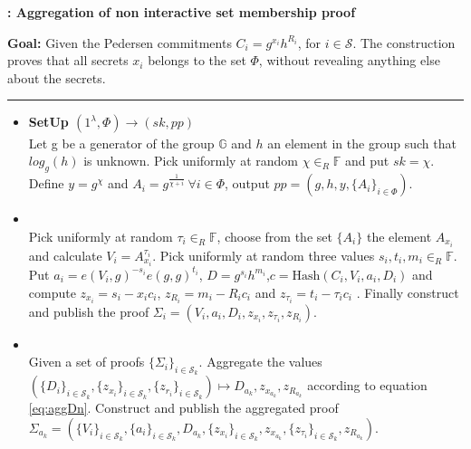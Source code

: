 \begin{algorithm}[]
\caption{\textbf{: Aggregation of non interactive set membership proof}}
\textbf{Goal:}  Given  the Pedersen commitments $C_i=g^{x_i} h^{R_i}$, for $i\in\mathcal{S}$. The construction  proves that all secrets $x_i$ belongs to the set $\Phi$, without revealing anything else about the secrets.
\vspace{2pt}\hrule\vspace{2pt}
\begin{itemize}
 \item\textbf{SetUp $(1^\lambda,\Phi)\xrightarrow[]{}(sk,pp)$}\\
 Let g be a generator of the group $\mathds{G}$ and $h$ an element in the group such that $log_g(h)$ is unknown.  
Pick uniformly at random $\chi\in_R\mathds{F}$ and put $sk=\chi$. Define $y=g^\chi$ and $A_i=g^{\frac{1}{\chi+i}} \:\forall i\in\Phi$, output $pp=(g,h,y,\{A_i\}_{i\in\Phi})$.

\item{}\\
Pick uniformly at random $\tau_i\in_R\mathds{F}$, choose from the set $\{A_i\}$ the element $A_{x_i}$ and calculate $V_i=A_{x_i}^{\tau_i}$. Pick uniformly at random three values $s_i,t_i,m_i\in_R\mathds{F}$. Put $a_i=e(V_i,g)^{-s_i}e(g,g)^{t_i}$,  $D=g^{s_i}h^{m_i}$,$c=\text{Hash}(C_i,V_i,a_i,D_i)$ and compute $z_{x_i} = s_i-x_i c_i$, $z_{R_i} = m_i-R_ic_i$ and $z_{\tau_i}= t_i-\tau_i c_i$ . Finally construct and publish the proof $\Sigma_i = (V_i,a_i,D_i,z_{x_i},z_{\tau_i},z_{R_i})$.

\item {} \\
Given a set of  proofs  $\{\Sigma_i\}_{i\in\mathcal{S}_k}$. Aggregate the values $( \{D_i \}_{i\in\mathcal{S}_k }, \{ z_{x_i}\}_{i\in\mathcal{S}_k }, \{ z_{r_i}\}_{i\in\mathcal{S}_k  }) \mapsto D_{a_k},z_{x_{a_k}},z_{R_{a_k}}$ according to equation \eqref{eq:aggDn}. Construct and publish the aggregated proof $\Sigma_{a_k} = (\{V_i\}_{i\in\mathcal{S}_k },\{a_i\}_{i\in\mathcal{S}_k },D_{a_k},\{z_{x_i}\}_{i\in\mathcal{S}_k }, z_{x_{a_k}}, \{z_{\tau_i}\}_{i\in\mathcal{S}_k },z_{R_{a_k}})$.


\end{itemize}
\end{algorithm}
